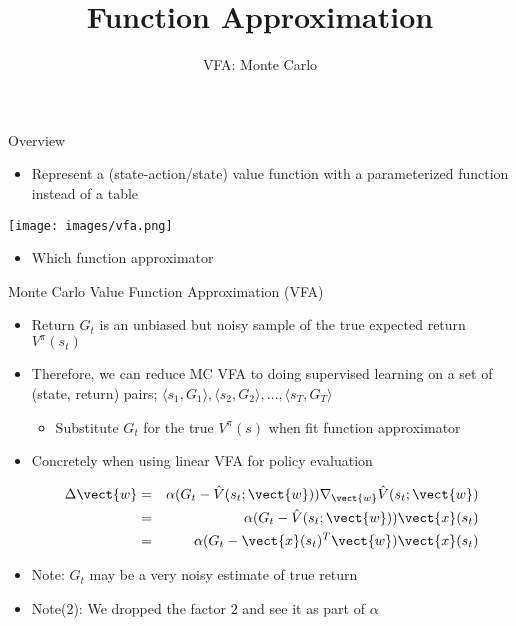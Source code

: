 \documentclass[aspectratio=169]{../latex_main/tntbeamer}  %
\title[RL: Function Approximation]{Function Approximation}
\subtitle{VFA: Monte Carlo}
\begin{document}
	
	\maketitle

\begin{frame}[c]{Overview}
	
	
\begin{itemize}
	\item Represent a (state-action/state) value function with a parameterized
	function instead of a table
\end{itemize}

\begin{center}
	\texttt{[image: images/vfa.png]}
\end{center}

\begin{itemize}
	\item \alert{Which function approximator}
\end{itemize}

\end{frame}
\begin{frame}[c]{Monte Carlo Value Function Approximation (VFA)}
	
	
	\begin{itemize}
		\item Return $G_t$ is an unbiased but noisy sample of the true expected return $V^\pi(s_t)$
		\item Therefore, we can reduce MC VFA to doing supervised learning on a set of (state, return) pairs; $\langle s_1, G_1 \rangle, \langle s_2, G_2 \rangle,\ldots, \langle s_T, G_T \rangle$
		\begin{itemize}
			\item Substitute $G_t$ for the true $V^\pi(s)$ when fit function approximator
		\end{itemize}
		\item Concretely when using linear VFA for policy evaluation
		
		\begin{eqnarray}
		 \Delta \vect{w} &=& \alpha (G_t - \hat{V} (s_t; \vect{w})) \nabla_{\vect{w}}\hat{V}(s_t; \vect{w}) \nonumber\\
		 &=& \alpha (G_t - \hat{V} (s_t; \vect{w})) \vect{x}(s_t) \nonumber\\
		 &=& \alpha (G_t - \vect{x}(s_t)^T \vect{w}) \vect{x}(s_t) \nonumber
		\end{eqnarray}
		
		\item Note: $G_t$ may be a very noisy estimate of true return
		\item Note(2): We dropped the factor $2$ and see it as part of $\alpha$
		
	\end{itemize}
	
\end{frame}
\end{document}

